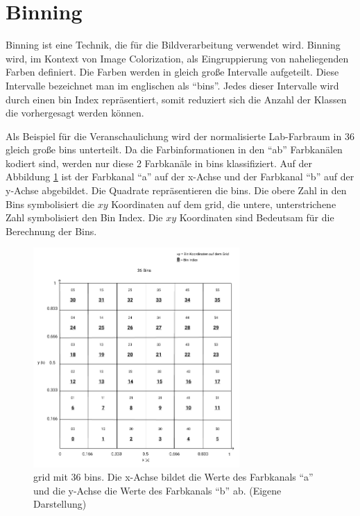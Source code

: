 \section{Binning}\label{section:binning}
Binning ist eine Technik, die für die Bildverarbeitung verwendet wird. Binning wird, im Kontext von Image Colorization, als Eingruppierung 
von naheliegenden Farben definiert. Die Farben werden in gleich große Intervalle aufgeteilt. Diese Intervalle bezeichnet man im englischen als
``\gls{bin}s''. Jedes dieser Intervalle wird durch einen \gls{bin} Index repräsentiert, somit reduziert sich die Anzahl der Klassen die vorhergesagt werden
können.

Als Beispiel für die Veranschaulichung wird der normalisierte Lab-Farbraum in 36 gleich große \gls{bin}s unterteilt. Da die Farbinformationen 
in den ``ab'' Farbkanälen kodiert sind, werden nur diese 2 Farbkanäle in \gls{bin}s klassifiziert. Auf der Abbildung \ref{image:bins} ist der Farbkanal 
``a'' auf der x-Achse und der Farbkanal ``b'' auf der y-Achse abgebildet. Die Quadrate repräsentieren die \gls{bin}s. Die obere Zahl in den Bins 
symbolisiert die $xy$ Koordinaten auf dem \gls{grid}, die untere, unterstrichene Zahl symbolisiert den Bin Index. 
Die $xy$ Koordinaten sind Bedeutsam für die Berechnung der Bins.

\begin{figure}[H]
  \centering
  \includegraphics[width=0.7\textwidth]{resources/bins/bins.jpg}
  \caption{
  \gls{grid} mit 36 bins. Die x-Achse bildet die Werte des Farbkanals ``a'' und die y-Achse die Werte des Farbkanals ``b'' ab. (Eigene Darstellung)
  }
  \label{image:bins}
\end{figure}

